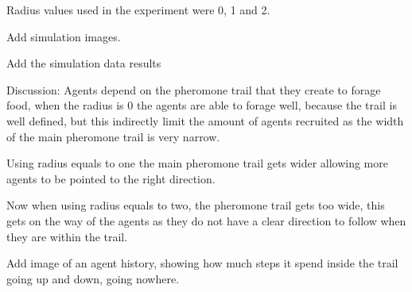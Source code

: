 Radius values used in the experiment were 0, 1 and 2.

Add simulation images.

Add the simulation data results

Discussion: Agents depend on the pheromone trail that they create to forage food, when the radius is 0 the agents are able to forage well, because the trail is well defined, but this indirectly limit the amount of agents recruited as the width of the main pheromone trail is very narrow. 

Using radius equals to one the main pheromone trail gets wider allowing more agents to be pointed to the right direction.

Now when using radius equals to two, the pheromone trail gets too wide, this gets on the way of the agents as they do not have a clear direction to follow when they are within the trail. 

Add image of an agent history, showing how much steps it spend inside the trail going up and down, going nowhere.